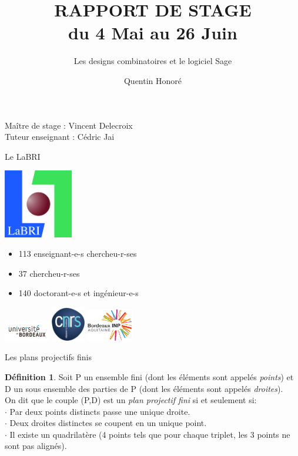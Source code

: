 \documentclass[10pt]{beamer}
\title{\huge RAPPORT DE STAGE \\ \normalsize du 4 Mai au 26 Juin}
\subtitle{\large Les designs combinatoires et le logiciel Sage}
\author{\large Quentin Honoré}
\institute{\large LaBRI}
\date{}
\theoremstyle{definition}
\newtheorem{Def}{Définition}[section]
\begin{document}
\begin{frame}
  \titlepage
      {\footnotesize Maître de stage : Vincent Delecroix\\
        Tuteur enseignant : Cédric Jai}
\end{frame}


\begin{frame}
    {\Huge Le LaBRI}
  \begin{minipage}{0.3\linewidth}
    \includegraphics[height=3cm]{labri.jpg}
  \end{minipage}
  \begin{minipage}{0.65\linewidth}
    \begin{itemize}
    \item 113 enseignant-e-s chercheu-r-ses
    \item 37 chercheu-r-ses
      \item 140 doctorant-e-s et ingénieur-e-s
    \end{itemize}
    
    \includegraphics[width=2cm]{univbdx.jpg}\;
    \includegraphics[height=1.5cm]{cnrs.png}\;
    \includegraphics[width=2cm]{inp.PNG}
    \end{minipage}
\end{frame}


\begin{frame}
{\Huge Les plans projectifs finis}
\begin{Def}
Soit P un ensemble fini (dont les éléments sont appelés \emph{points}) et D un sous ensemble des parties de P (dont les éléments sont appelés \emph{droites}).\medskip \\
On dit que le couple (P,D) est un \emph{plan projectif fini} si et seulement si: \\
$\cdot$ Par deux points distincts passe une unique droite. \\
$\cdot$ Deux droites distinctes se coupent en un unique point. \\
$\cdot$ Il existe un quadrilatère (4 points tels que pour chaque triplet, les 3 points ne sont pas alignés).
\end{Def}
\end{frame}
\end{document}
